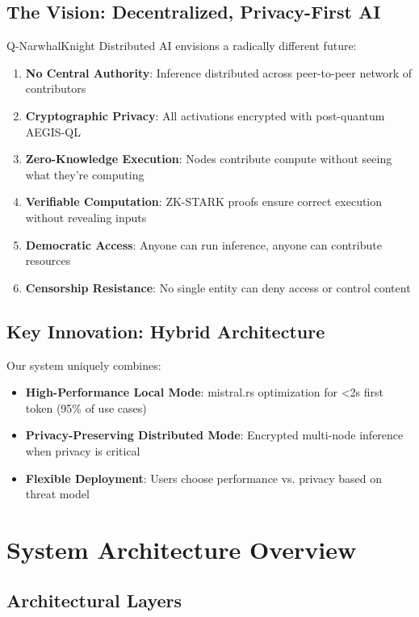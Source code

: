 \documentclass[11pt,a4paper]{article}
\begin{document}
\subsection{The Vision: Decentralized, Privacy-First AI}

Q-NarwhalKnight Distributed AI envisions a radically different future:

\begin{enumerate}[leftmargin=*]
    \item \textbf{No Central Authority}: Inference distributed across peer-to-peer network of contributors
    \item \textbf{Cryptographic Privacy}: All activations encrypted with post-quantum AEGIS-QL
    \item \textbf{Zero-Knowledge Execution}: Nodes contribute compute without seeing what they're computing
    \item \textbf{Verifiable Computation}: ZK-STARK proofs ensure correct execution without revealing inputs
    \item \textbf{Democratic Access}: Anyone can run inference, anyone can contribute resources
    \item \textbf{Censorship Resistance}: No single entity can deny access or control content
\end{enumerate}

\subsection{Key Innovation: Hybrid Architecture}

Our system uniquely combines:

\begin{itemize}[leftmargin=*]
    \item \textbf{High-Performance Local Mode}: mistral.rs optimization for <2s first token (95\% of use cases)
    \item \textbf{Privacy-Preserving Distributed Mode}: Encrypted multi-node inference when privacy is critical
    \item \textbf{Flexible Deployment}: Users choose performance vs. privacy based on threat model
\end{itemize}

\newpage
\section{System Architecture Overview}

\subsection{Architectural Layers}
\end{document}

